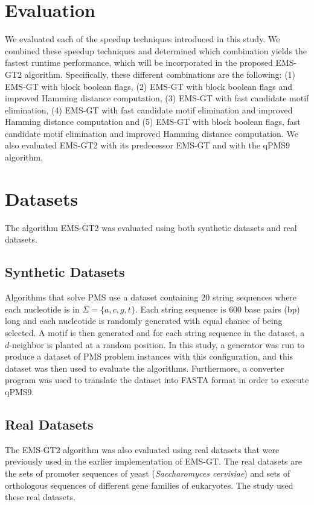 \section{Evaluation}
We evaluated each of the speedup techniques introduced in this study. We combined these speedup techniques and determined which combination yields the fastest runtime performance, which will be incorporated in the proposed EMS-GT2 algorithm. Specifically, these different combinations are the following: (1) EMS-GT with block boolean flags, (2) EMS-GT with block boolean flags and improved Hamming distance computation, (3) EMS-GT with fast candidate motif elimination, (4) EMS-GT with fast candidate motif elimination and improved Hamming distance computation and (5) EMS-GT with block boolean flags, fast candidate motif elimination and improved Hamming distance computation. We also evaluated EMS-GT2 with its predecessor EMS-GT and with the qPMS9 algorithm.

\section{Datasets}

The algorithm EMS-GT2 was evaluated using both synthetic datasets and real datasets.

\subsection{Synthetic Datasets}
Algorithms that solve PMS \cite{pevzner2000combinatorial, pms2014, pms2015} use a dataset containing $20$ string sequences where each nucleotide is in $\Sigma = \{a, c, g, t\}$. Each string sequence is $600$ base pairs (bp) long and each nucleotide is randomly generated with equal chance of being selected. A motif is then generated and for each string sequence in the dataset, a $d$-neighbor is planted at a random position. In this study, a generator was run to produce a dataset of PMS problem instances with this configuration, and this dataset was then used to evaluate the algorithms. Furthermore, a converter program was used to translate the dataset into FASTA format in order to execute qPMS9.


\subsection{Real Datasets}

The EMS-GT2 algorithm was also evaluated using real datasets that were previously used in the earlier implementation of EMS-GT. The real datasets are the sets of promoter sequences of yeast (\textit{Saccharomyces cervisiae}) \cite{zhu1999scpd} and sets of orthologous sequences of different gene families of eukaryotes. The study \cite{nabos2015dissertation} used these real datasets.



